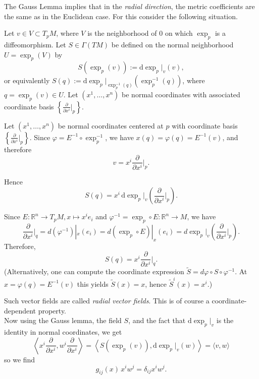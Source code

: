 The Gauss Lemma implies that in the \emph{radial direction}, the metric coefficients are the same as in the Euclidean case. For this consider the following situation.


Let $v \in V \subset T_p M$, where $V$ is the neighborhood of $0$ on which $\exp_p$ is a diffeomorphism. Let $S\in \Gamma(TM)$ be defined on the normal neighborhood $U = \exp_p(V)$ by
\[
S(\exp_p(v)) := \mathrm{d} \exp_p\big|_v (v),
\]
or equivalently $S(q) := \mathrm{d} \exp_p\big|_{\exp_p^{-1}(q)} (\exp_p^{-1}(q))$, where $q=\exp_p(v) \in U$. Let $(x^1,\dots,x^n)$ be normal coordinates with associated coordinate basis $\left\{\frac{\partial}{\partial x^i}\big|_p\right\}$. 


Let $(x^1,\dots,x^n)$ be normal coordinates centered at $p$ with coordinate basis $\left\{\frac{\partial}{\partial x^i}\big|_p\right\}$. Since $\varphi = E^{-1} \circ \exp_p^{-1}$, we have $x(q) = \varphi(q) = E^{-1}(v)$, and therefore
\[
v = x^i \frac{\partial}{\partial x^i}\Big|_p.
\]


Hence
\[
S(q)
= x^i\, \mathrm{d}\exp_p|_v \left( \frac{\partial}{\partial x^i}\Big|_p \right ).
\]

Since $E : \mathbb{R}^n \to T_p M, x \mapsto x^i e_i$ and $\varphi^{-1} = \exp_p \circ E : \mathbb{R}^n \to M$, we have
\[
\frac{\partial}{\partial x^i}\Big|_q
= d(\varphi^{-1})|_x(e_i)
= d(\exp_p \circ E)|_x(e_i)
= d\exp_p|_v\left( \frac{\partial}{\partial x^i}\Big|_p \right ).
\]
Therefore,
\[
S(q) = x^i \frac{\partial}{\partial x^i}\Big|_q.
\]
(Alternatively, one can compute the coordinate expression $\widetilde{S} = d\varphi \circ S \circ \varphi^{-1}$. At $x=\varphi(q)=E^{-1}(v)$ this yields $\widetilde{S}(x)=x$, hence $\widetilde{S}^i(x)=x^i$.)

Such vector fields are called \emph{radial vector fields}. This is of course a coordinate-dependent property. \\

Now using the Gauss lemma, the field $S$, and the fact that $\mathrm{d} \exp_p\big|_v$ is the identity in normal coordinates, we get 
$$\left\langle x^i \frac{\partial}{\partial x^i},w^i \frac{\partial}{\partial x^i}\right\rangle=\left\langle S(\exp_p(v)),\mathrm{d} \exp_p\big|_v(w)\right\rangle
= \langle v, w \rangle$$ 
so we find
\[
g_{ij}(x)\, x^i w^j = \delta_{ij} x^i w^j.\]

